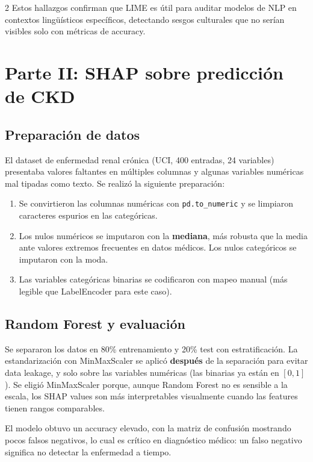 \documentclass[12pt, a4paper]{article}
\begin{document}
\begin{multicols}{2}
Estos hallazgos confirman que LIME es útil para auditar modelos de NLP en contextos lingüísticos específicos, detectando sesgos culturales que no serían visibles solo con métricas de accuracy.

\section{Parte II: SHAP sobre predicción de CKD}

\subsection{Preparación de datos}

El dataset de enfermedad renal crónica (UCI, 400 entradas, 24 variables) presentaba valores faltantes en múltiples columnas y algunas variables numéricas mal tipadas como texto. Se realizó la siguiente preparación:

\begin{enumerate}[leftmargin=1.5em, itemsep=2pt]
    \item Se convirtieron las columnas numéricas con \texttt{pd.to\_numeric} y se limpiaron caracteres espurios en las categóricas.
    \item Los nulos numéricos se imputaron con la \textbf{mediana}, más robusta que la media ante valores extremos frecuentes en datos médicos. Los nulos categóricos se imputaron con la moda.
    \item Las variables categóricas binarias se codificaron con mapeo manual (más legible que LabelEncoder para este caso).
\end{enumerate}

\subsection{Random Forest y evaluación}

Se separaron los datos en 80\% entrenamiento y 20\% test con estratificación. La estandarización con MinMaxScaler se aplicó \textbf{después} de la separación para evitar data leakage, y solo sobre las variables numéricas (las binarias ya están en $[0,1]$). Se eligió MinMaxScaler porque, aunque Random Forest no es sensible a la escala, los SHAP values son más interpretables visualmente cuando las features tienen rangos comparables.

El modelo obtuvo un accuracy elevado, con la matriz de confusión mostrando pocos falsos negativos, lo cual es crítico en diagnóstico médico: un falso negativo significa no detectar la enfermedad a tiempo.


\end{multicols}
\end{document}
